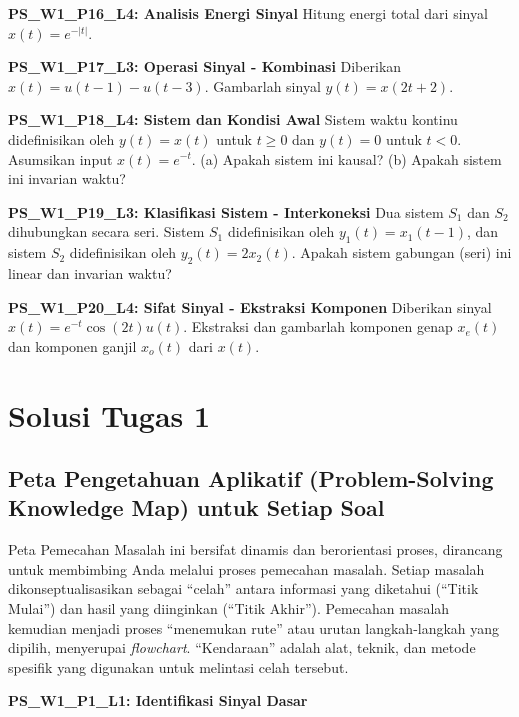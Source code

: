 \documentclass[
  letterpaper,
  DIV=11,
  numbers=noendperiod]{scrreprt}
\begin{document}
\textbf{PS\_W1\_P16\_L4: Analisis Energi Sinyal} Hitung energi total
dari sinyal \(x(t) = e^{-|t|}\).

\textbf{PS\_W1\_P17\_L3: Operasi Sinyal - Kombinasi} Diberikan
\(x(t) = u(t-1) - u(t-3)\). Gambarlah sinyal \(y(t) = x(2t+2)\).

\textbf{PS\_W1\_P18\_L4: Sistem dan Kondisi Awal} Sistem waktu kontinu
didefinisikan oleh \(y(t) = x(t)\) untuk \(t \ge 0\) dan \(y(t) = 0\)
untuk \(t < 0\). Asumsikan input \(x(t) = e^{-t}\). (a) Apakah sistem
ini kausal? (b) Apakah sistem ini invarian waktu?

\textbf{PS\_W1\_P19\_L3: Klasifikasi Sistem - Interkoneksi} Dua sistem
\(S_1\) dan \(S_2\) dihubungkan secara seri. Sistem \(S_1\)
didefinisikan oleh \(y_1(t) = x_1(t-1)\), dan sistem \(S_2\)
didefinisikan oleh \(y_2(t) = 2x_2(t)\). Apakah sistem gabungan (seri)
ini linear dan invarian waktu?

\textbf{PS\_W1\_P20\_L4: Sifat Sinyal - Ekstraksi Komponen} Diberikan
sinyal \(x(t) = e^{-t} \cos(2t) u(t)\). Ekstraksi dan gambarlah komponen
genap \(x_e(t)\) dan komponen ganjil \(x_o(t)\) dari \(x(t)\).


\chapter{Solusi Tugas 1}\label{solusi-tugas-1}

\section{Peta Pengetahuan Aplikatif (Problem-Solving Knowledge Map)
untuk Setiap
Soal}\label{peta-pengetahuan-aplikatif-problem-solving-knowledge-map-untuk-setiap-soal-1}

Peta Pemecahan Masalah ini bersifat dinamis dan berorientasi proses,
dirancang untuk membimbing Anda melalui proses pemecahan masalah. Setiap
masalah dikonseptualisasikan sebagai ``celah'' antara informasi yang
diketahui (``Titik Mulai'') dan hasil yang diinginkan (``Titik Akhir'').
Pemecahan masalah kemudian menjadi proses ``menemukan rute'' atau urutan
langkah-langkah yang dipilih, menyerupai \emph{flowchart}. ``Kendaraan''
adalah alat, teknik, dan metode spesifik yang digunakan untuk melintasi
celah tersebut.

\textbf{PS\_W1\_P1\_L1: Identifikasi Sinyal Dasar}
\end{document}
